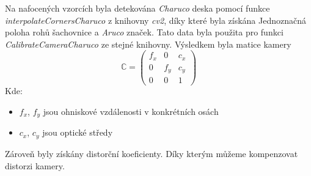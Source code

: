 \documentclass[journal,twoside,web]{ieeecolor}
\begin{document}
    Na nafocených vzorcích byla detekována \textit{Charuco} deska pomocí funkce \textit{interpolateCornersCharuco}
    z knihovny \textit{cv2}, díky které byla získána Jednoznačná poloha rohů šachovnice a \textit{Aruco} značek.
    Tato data byla použita pro funkci \textit{CalibrateCameraCharuco} ze stejné knihovny.
    Výsledkem byla matice kamery
    \begin{equation}
        \mathbb{C} = \begin{pmatrix}f_x&0&c_x\\0&f_y&c_y\\0&0&1\end{pmatrix}
    \end{equation}
    Kde:
    \begin{itemize}
        \item $f_x$, $f_y$ jsou ohniskové vzdálenosti v konkrétních osách\\
        \item $c_x$, $c_y$ jsou optické středy\\
    \end{itemize}
    Zároveň byly získány distorční koeficienty. Díky kterým můžeme kompenzovat distorzi kamery.
\end{document}
